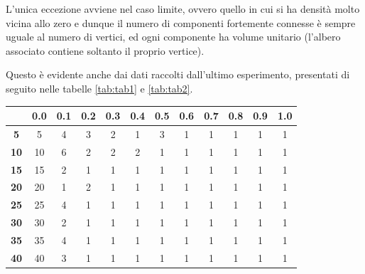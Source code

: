 \documentclass[a4paper,12pt]{article}
\begin{document}
L'unica eccezione avviene nel caso limite, ovvero quello in cui si ha densità molto vicina allo zero e dunque il numero di componenti fortemente connesse è sempre uguale al numero di vertici, ed ogni componente ha volume unitario (l'albero associato contiene soltanto il proprio vertice).
\newline

Questo è evidente anche dai dati raccolti dall'ultimo esperimento, presentati di seguito nelle tabelle \ref{tab:tab1} e \ref{tab:tab2}.

\begin{center}
\vspace*{0.9cm}
\begin{tabular}{|c|c|c|c|c|c|c|c|c|c|c|c|}
\hline
& \textbf{0.0}\bigstrut & \textbf{0.1} & \textbf{0.2} & \textbf{0.3} & \textbf{0.4} & \textbf{0.5} & \textbf{0.6} & \textbf{0.7} & \textbf{0.8} & \textbf{0.9} & \textbf{1.0} \\\hline
\textbf{5}\bigstrut & 5 & 4 & 3 & 2 & 1 & 3 & 1 & 1 & 1 & 1 & 1 \\\hline
\textbf{10}\bigstrut & 10 & 6 & 2 & 2 & 2 & 1 & 1 & 1 & 1 & 1 & 1 \\\hline
\textbf{15}\bigstrut & 15 & 2 & 1 & 1 & 1 & 1 & 1 & 1 & 1 & 1 & 1 \\\hline
\textbf{20}\bigstrut & 20 & 1 & 2 & 1 & 1 & 1 & 1 & 1 & 1 & 1 & 1 \\\hline
\textbf{25}\bigstrut & 25 & 4 & 1 & 1 & 1 & 1 & 1 & 1 & 1 & 1 & 1 \\\hline
\textbf{30}\bigstrut & 30 & 2 & 1 & 1 & 1 & 1 & 1 & 1 & 1 & 1 & 1 \\\hline
\textbf{35}\bigstrut & 35 & 4 & 1 & 1 & 1 & 1 & 1 & 1 & 1 & 1 & 1 \\\hline
\textbf{40}\bigstrut & 40 & 3 & 1 & 1 & 1 & 1 & 1 & 1 & 1 & 1 & 1 \\\hline
\end{tabular}
\captionsetup{justification=centering,margin=1.05cm}
\label{tab:tab1}
\end{center}
\end{document}
